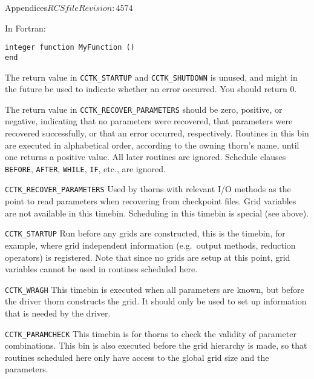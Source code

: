 \begin{cactuspart}{Appendices}{$RCSfile$}{$Revision: 4574 $}
\begin{Lentry}
\item[In Fortran:]
\begin{verbatim}
integer function MyFunction ()
end
\end{verbatim}
\end{Lentry}

The return value in {\tt CCTK\_STARTUP} and {\tt CCTK\_SHUTDOWN} is
unused, and might in the future be used to indicate whether an error
occurred.  You should return 0.

The return value in {\tt CCTK\_RECOVER\_PARAMETERS} should be zero,
positive, or negative, indicating that no parameters were recovered,
that parameters were recovered successfully, or that an error
occurred, respectively.  Routines in this bin are executed in alphabetical
order, according to the owning thorn's name, until one returns a positive
value.  All later routines are ignored.  Schedule clauses \texttt{BEFORE}, 
\texttt{AFTER}, \texttt{WHILE}, \texttt{IF}, etc., are ignored.


\begin{Lentry}

\item[{\tt CCTK\_RECOVER\_PARAMETERS}]
        Used by thorns with relevant I/O methods as the point 
        to read parameters when recovering from checkpoint files.
        Grid variables are not available in this timebin.  Scheduling
	in this timebin is special (see above).

\item[{\tt CCTK\_STARTUP}] 
        Run before any grids are constructed, this is 
        the timebin, for example, where grid independent information 
        (e.g.\ output methods, reduction operators) is registered. 
        Note that since no grids are setup at this point, grid 
        variables cannot be used in routines scheduled here.

\item[{\tt CCTK\_WRAGH}]
        This timebin is executed when all parameters are known, but
        before the driver thorn constructs the grid.  It should only
        be used to set up information that is needed by the driver.

\item[{\tt CCTK\_PARAMCHECK}] 
        This timebin is for thorns to check the validity of
        parameter combinations. This bin is also executed before the
        grid hierarchy is made, so that routines scheduled here only
        have access to the global grid size and the parameters.


\end{Lentry}
\end{cactuspart}
